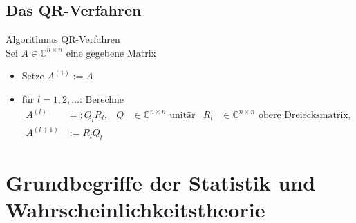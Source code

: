 \documentclass[
	ngerman,
	accentcolor=9c,%
	type=intern,
	marginpar=false
	]{tudapub}
\begin{document}
        \subsection{Das QR-Verfahren}
        \begin{definition}
            Algorithmus QR-Verfahren\\
            Sei $A\in \mathbb{C}^{n \times n}$ eine gegebene Matrix
            \begin{itemize}
                \item Setze $A^{(1)}:= A$
                \item für $l = 1,2, \dots$: Berechne
                \begin{align*}
                    A^{(l)}&=:Q_l R_l, & Q &\in \mathbb{C}^{n \times n} \text{ unitär} & R_l &\in \mathbb{C}^{n \times n} \text{ obere Dreiecksmatrix,}\\
                    A^{(l+1)} &:= R_lQ_l
                \end{align*}
            \end{itemize}
        \end{definition}
        \newpage
    \section{Grundbegriffe der Statistik und Wahrscheinlichkeitstheorie}
\end{document}
